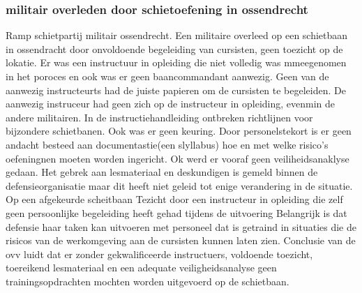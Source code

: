 \documentclass{article}
\begin{document}
	\subsubsection{militair overleden door schietoefening in ossendrecht}
	\newline \indent Ramp schietpartij militair ossendrecht. Een militaire overleed op een schietbaan in ossendracht door onvoldoende begeleiding van cursisten, geen toezicht op de lokatie. Er was een instructuur in opleiding die niet volledig was mmeegenomen in het poroces en ook was er geen baancommandant aanwezig. Geen van de aanwezig instructeurts had de juiste papieren om de cursisten te begeleiden. De aanwezig instruceur had geen zich op de instructeur in opleiding, evenmin de andere militairen. In de instructiehandleiding ontbreken richtlijnen voor bijzondere schietbanen. Ook was er geen keuring. Door personelstekort is er geen andacht besteed aan documentastie(een slyllabus) hoe en met welke risico’s oefeningnen moeten worden ingericht. Ok werd er vooraf geen veiliheidsanaklyse gedaan. Het gebrek aan lesmateriaal en deskundigen is gemeld binnen de defensieorganisatie maar dit heeft niet geleid tot enige verandering in de situatie.
	Op een afgekeurde scheitbaan
	Tezicht door een instructeur in opleiding die zelf geen persoonlijke begeleiding heeft gehad tijdens de uitvoering
	Belangrijk is dat defensie haar taken kan uitvoeren met personeel dat is getraind in situaties die de risicos van de werkomgeving aan de cursisten kunnen laten zien.
	Conclusie van de ovv luidt dat er zonder gekwalificeerde instructuers, voldoende toezicht, toereikend lesmateriaal en een 
	adequate veiligheidsanalyse geen trainingsopdrachten mochten worden uitgevoerd  op de schietbaan.
	\cite{ovvVideoOssendrecht}
	\cite{nos22032016ossendrecht}
	\cite{ovv04042016lessenongevalossendrecht}
	\cite{quekelboere10052017doodossendrecht}
\end{document}
